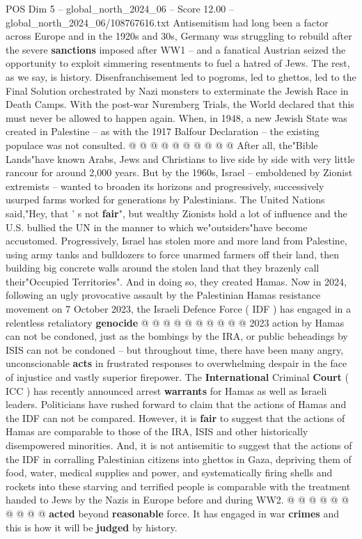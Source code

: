 \begin{textsample}{POS Dim 5 – global\_north\_2024\_06 – Score 12.00 – global\_north\_2024\_06/108767616.txt}
Antisemitism had long been a factor across Europe and in the 1920s and 30s, Germany was struggling to rebuild after the severe \textbf{sanctions} imposed after WW1 -- and a fanatical Austrian seized the opportunity to exploit simmering resentments to fuel a hatred of Jews.
The rest, as we say, is history.
Disenfranchisement led to pogroms, led to ghettos, led to the Final Solution orchestrated by Nazi monsters to exterminate the Jewish Race in Death Camps.
With the post-war Nuremberg Trials, the World declared that this must never be allowed to happen again.
When, in 1948, a new Jewish State was created in Palestine -- as with the 1917 Balfour Declaration -- the existing populace was not consulted. @ @ @ @ @ @ @ @ @ @ After all, the"Bible Lands"have known Arabs, Jews and Christians to live side by side with very little rancour for around 2,000 years.
But by the 1960s, Israel -- emboldened by Zionist extremists -- wanted to broaden its horizons and progressively, successively usurped farms worked for generations by Palestinians.
The United Nations said,"Hey, that ' s not \textbf{fair}", but wealthy Zionists hold a lot of influence and the U.S. bullied the UN in the manner to which we"outsiders"have become accustomed.
Progressively, Israel has stolen more and more land from Palestine, using army tanks and bulldozers to force unarmed farmers off their land, then building big concrete walls around the stolen land that they brazenly call their"Occupied Territories".
And in doing so, they created Hamas.
Now in 2024, following an ugly provocative assault by the Palestinian Hamas resistance movement on 7 October 2023, the Israeli Defence Force ( IDF ) has engaged in a relentless retaliatory \textbf{genocide} @ @ @ @ @ @ @ @ @ @ 2023 action by Hamas can not be condoned, just as the bombings by the IRA, or public beheadings by ISIS can not be condoned -- but throughout time, there have been many angry, unconscionable \textbf{acts} in frustrated responses to overwhelming despair in the face of injustice and vastly superior firepower.
The \textbf{International} Criminal \textbf{Court} ( ICC ) has recently announced arrest \textbf{warrants} for Hamas as well as Israeli leaders.
Politicians have rushed forward to claim that the actions of Hamas and the IDF can not be compared.
However, it is \textbf{fair} to suggest that the actions of Hamas are comparable to those of the IRA, ISIS and other historically disempowered minorities.
And, it is not antisemitic to suggest that the actions of the IDF in corralling Palestinian citizens into ghettos in Gaza, depriving them of food, water, medical supplies and power, and systematically firing shells and rockets into these starving and terrified people is comparable with the treatment handed to Jews by the Nazis in Europe before and during WW2. @ @ @ @ @ @ @ @ @ @ \textbf{acted} beyond \textbf{reasonable} force.
It has engaged in war \textbf{crimes} and this is how it will be \textbf{judged} by history.

\end{textsample}
